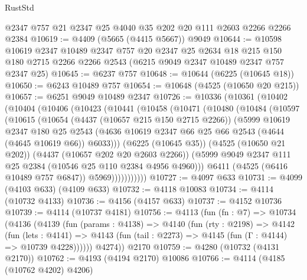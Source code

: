 \begin{lexlean}{RustStd}
\begin{coremodule}
{\begin{coremodule}
{{{{{{{{{{{{{{    @2347
    @757
    @21
    @2347
    @25
    @4040
    @35
    @202
    @20
    @111
    @2603
    @2266
    @2266
    @2384
@10619 := @4409 (@5665 (@4415 @5667)) @9049
@10644 := @10598
    @10619
    @2347
    @10489
    @2347
    @757
    @20
    @2347
    @25
    @2634
    @18
    @215
    @150
    @180
    @2715
    @2266
    @2266
    @2543
    (@6215 @9049 @2347 @10489 @2347 @757 @2347 @25)
@10645 := @6237 @757
@10648 := @10644 (@6225 (@10645 @18))
@10650 := @6243 @10489 @757
@10654 := @10648 (@4525 (@10650 @20 @215))
@10657 := @6251 @9049 @10489 @2347
@10726 := @10336
    (@10361
      (@10402
        (@10404
          (@10406
            (@10423
              (@10441
                (@10458
                  (@10471
                    (@10480
                      (@10484
                        (@10597
                          (@10615
                            (@10654
                              (@4437 (@10657 @215 @150 @2715 @2266))
                              (@5999
                                @10619
                                @2347
                                @180
                                @25
                                @2543
                                (@4636
                                  @10619
                                  @2347
                                  @66
                                  @25
                                  @66
                                  @2543
                                  (@4644 (@4645 @10619 @66))
                                  @6033)))
                            (@6225 (@10645 @35))
                            (@4525 (@10650 @21 @202))
                            (@4437 (@10657 @202 @20 @2603 @2266))
                            (@5999 @9049 @2347 @111 @25 @2384 (@10546 @25 @110 @2384 @4956 @4960)))
                          @6411
                          (@4525 (@6416 @10489 @757 @6847))
                          @5969)))))))))))
@10727 := @4097 @633
@10731 := @4099 (@4103 @633) (@4109 @633)
@10732 := @4118 @10083
@10734 := @4114 (@10732 @4133)
@10736 := @4156 (@4157 @633)
@10737 := @4152 @10736
@10739 := @4114 (@10737 @4181)
@10756 := @4113
    (fun (fn : @7) =>
    @10734
      (@4136
        (@4139
          (fun (params : @4138) =>
          @4140
            (fun (rty : @2198) =>
            @4142
              (fun (lets : @4141) =>
              @4143 (fun (tail : @2273) => @4145 (fun (Γ : @4144) => @10739 @4228))))))
        @4274))
    @2170
@10759 := @4280 (@10732 (@4131 @2170))
@10762 := @4193 (@4194 @2170) @10086
@10766 := @4114 (@4185 (@10762 @4202) @4206)
}}}}}}}}}}}}}}
\end{coremodule}}
\end{coremodule}
\end{lexlean}
